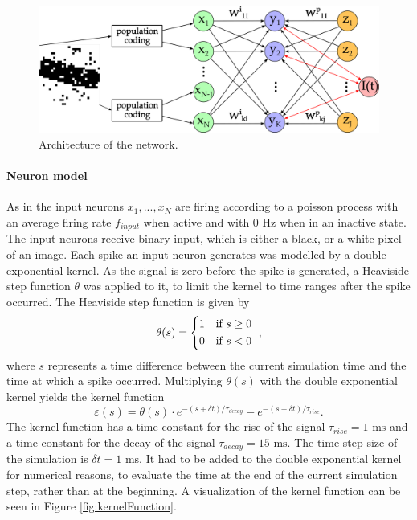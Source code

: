 \begin{figure}
  \label{fig:networkArchitecture}
  \includegraphics[width=\linewidth]{figures/networkPlan.png}
  \caption{Architecture of the network.}
\end{figure}

\paragraph{Neuron model}
As in \citet{nessler} the input neurons $x_1,...,x_N$ are firing according to a poisson process with an average firing rate $f_{input}$ when active and with 0 Hz when in an inactive state. The input neurons receive binary input, which is either a black, or a white pixel of an image. Each spike an input neuron generates was modelled by a double exponential kernel. As the signal is zero before the spike is generated, a Heaviside step function $\theta$ was applied to it, to limit the kernel to time ranges after the spike occurred. The Heaviside step function is given by
\begin{equation}
\theta (s) = \begin{dcases*} 1 & if $s \geq 0$ \\
0 & if $s < 0 $ \end{dcases*},
\end{equation}
where $s$ represents a time difference between the current simulation time and the time at which a spike occurred.
Multiplying $\theta(s)$ with the double exponential kernel yields the kernel function 
\begin{equation}
\varepsilon (s) = \theta (s) \cdot e^{-(s + \delta t) / \tau_{decay}} - e^{-(s + \delta t) / \tau_{rise}}.
\end{equation}
The kernel function has a time constant for the rise of the signal $\tau_{rise} = 1\text{ ms}$ and a time constant for the decay of the signal $\tau_{decay} = 15\text{ ms}$. The time step size of the simulation is $\delta t = 1\text{ ms}$. It had to be added to the double exponential kernel for numerical reasons, to evaluate the time at the end of the current simulation step, rather than at the beginning. A visualization of the kernel function can be seen in Figure \ref{fig:kernelFunction}. 

